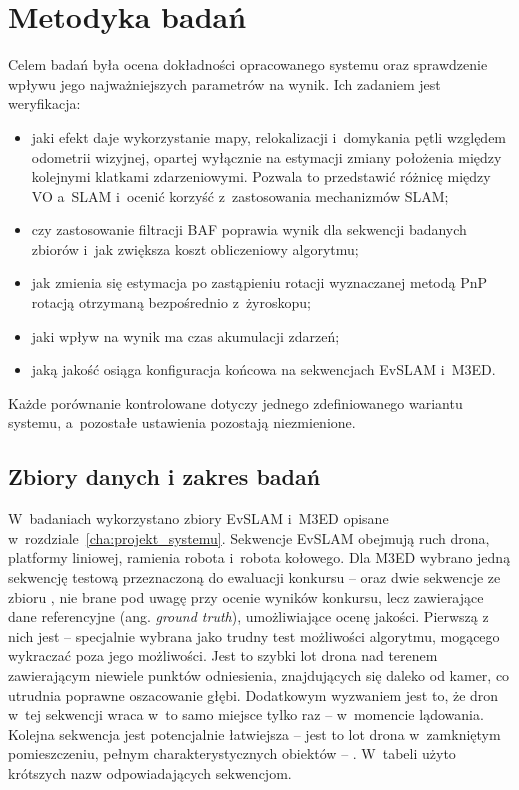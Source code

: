 \chapter{Metodyka badań}
\label{cha:metodyka_badan}

Celem badań była ocena dokładności opracowanego systemu oraz sprawdzenie wpływu jego najważniejszych parametrów na wynik. Ich zadaniem jest weryfikacja:
\begin{itemize}
    \item jaki efekt daje wykorzystanie mapy, relokalizacji i~domykania pętli względem odometrii wizyjnej, opartej wyłącznie na estymacji zmiany położenia między kolejnymi klatkami zdarzeniowymi. Pozwala to przedstawić różnicę między VO a~SLAM i~ocenić korzyść z~zastosowania mechanizmów SLAM;
    \item czy zastosowanie filtracji BAF poprawia wynik dla sekwencji badanych zbiorów i~jak zwiększa koszt obliczeniowy algorytmu;
    \item jak zmienia się estymacja po zastąpieniu rotacji wyznaczanej metodą PnP rotacją otrzymaną bezpośrednio z~żyroskopu;
    \item jaki wpływ na wynik ma czas akumulacji zdarzeń;
    \item jaką jakość osiąga konfiguracja końcowa na sekwencjach EvSLAM i~M3ED.
\end{itemize}
Każde porównanie kontrolowane dotyczy jednego zdefiniowanego wariantu systemu, a~pozostałe ustawienia pozostają niezmienione.

\section{Zbiory danych i zakres badań}
\label{sec:zbiory_danych}

W~badaniach wykorzystano zbiory EvSLAM i~M3ED opisane w~rozdziale~\ref{cha:projekt_systemu}.
Sekwencje EvSLAM obejmują ruch drona, platformy liniowej, ramienia robota i~robota kołowego.
Dla M3ED wybrano jedną sekwencję testową przeznaczoną do ewaluacji konkursu \cite{m3ed2025challenge} --  oraz dwie sekwencje ze zbioru \cite{m3ed2025data}, nie brane pod uwagę przy ocenie wyników konkursu, lecz zawierające dane referencyjne (ang. \textit{ground truth}), umożliwiające ocenę jakości. Pierwszą z nich jest  -- specjalnie wybrana jako trudny test możliwości algorytmu, mogącego wykraczać poza jego możliwości. Jest to szybki lot drona nad terenem zawierającym niewiele punktów odniesienia, znajdujących się daleko od kamer, co utrudnia poprawne oszacowanie głębi. Dodatkowym wyzwaniem jest to, że dron w~tej sekwencji wraca w~to samo miejsce tylko raz -- w~momencie lądowania. Kolejna sekwencja jest potencjalnie łatwiejsza -- jest to lot drona w~zamkniętym pomieszczeniu, pełnym charakterystycznych obiektów -- . W~tabeli użyto krótszych nazw odpowiadających sekwencjom.

